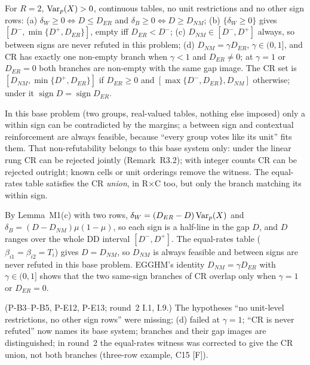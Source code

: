 \begin{result}\label{res:m3}
 For $R=2$, $\operatorname{Var}_p(X)>0$, continuous tables, no unit
restrictions and no other sign rows: (a) $\delta_W\ge0\iff D\le D_{ER}$ and
$\delta_B\ge0\iff D\ge D_{NM}$; (b) $\{\delta_W\ge0\}$ gives
$[D^-,\min\{D^+,D_{ER}\}]$, empty iff $D_{ER}<D^-$; (c) $D_{NM}\in[D^-,D^+]$
always, so between signs are never refuted in this problem; (d)
$D_{NM}=\gamma D_{ER}$, $\gamma\in(0,1]$, and CR has exactly one non-empty branch
when $\gamma<1$ and $D_{ER}\ne0$; at $\gamma=1$ or $D_{ER}=0$ both branches are
non-empty with the same gap image. The CR set is $[D_{NM},\min\{D^+,D_{ER}\}]$
if $D_{ER}\ge0$ and $[\max\{D^-,D_{ER}\},D_{NM}]$ otherwise; under it
$\operatorname{sign}D=\operatorname{sign}D_{ER}$.
\end{result}
\begin{plain}
In this base problem (two groups, real-valued tables, nothing else imposed) only a
within sign can be contradicted by the margins; a between sign and contextual
reinforcement are always feasible, because ``every group votes like its unit''
fits them. That non-refutability belongs to this base system only: under the
linear rung CR can be rejected jointly (Remark~R3.2); with integer counts CR can be
rejected outright; known cells or unit orderings remove the witness. The
equal-rates table satisfies the CR \emph{union}, in R$\times$C too, but only the
branch matching its within sign.
\end{plain}
\begin{sketch}
By Lemma~M1(c) with two rows, $\delta_W=(D_{ER}-D)\operatorname{Var}_p(X)$ and
$\delta_B=(D-D_{NM})\mu(1-\mu)$, so each sign is a half-line in the gap $D$, and
$D$ ranges over the whole DD interval $[D^-,D^+]$. The equal-rates table
($\beta_{i1}=\beta_{i2}=T_i$) gives $D=D_{NM}$, so $D_{NM}$ is always feasible and
between signs are never refuted in this base problem. EGGHM's identity
$D_{NM}=\gamma D_{ER}$ with $\gamma\in(0,1]$ shows that the two same-sign branches
of CR overlap only when $\gamma=1$ or $D_{ER}=0$.
\end{sketch}
\begin{revnote}
(P-B3--P-B5, P-E12, P-E13; round~2 I.1, I.9.) The hypotheses ``no unit-level
restrictions, no other sign rows'' were missing; (d) failed at $\gamma=1$;
``CR is never refuted'' now names its base system; branches and their gap images
are distinguished; in round~2 the equal-rates witness was corrected to give the
CR union, not both branches (three-row example, C15 [F]).
\end{revnote}

